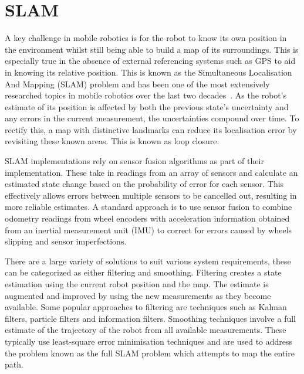 \section{SLAM}\label{litreview/slam}
A key challenge in mobile robotics is for the robot to know its own position in the
environment whilst still being able to build a map of its surroundings. 
This is especially true in the absence of external referencing systems
such as GPS to aid in knowing its relative position. This is known as the Simultaneous Localisation And Mapping (SLAM)
problem and has been one of the most extensively researched topics in mobile
robotics over the last two decades~\cite{grisetti2010tutorial}. As the robot's
estimate of its position is affected by both the previous state's uncertainty
and any errors in the current measurement, the uncertainties compound
over time. To rectify this, a map with distinctive landmarks can reduce its
localisation error by revisiting these known areas. This is known as loop closure.

SLAM implementations rely on sensor fusion algorithms as part of their implementation. 
These take in readings from an array of sensors and calculate an estimated state change
based on the probability of error for each sensor. This effectively allows errors between 
multiple sensors to be cancelled out, resulting in more reliable estimates. A standard 
approach is to use sensor fusion to combine odometry readings from wheel encoders with 
acceleration information obtained from an inertial measurement unit (IMU) to correct for 
errors caused by wheels slipping and sensor imperfections.

There are a large variety of solutions to suit various system requirements, these
can be categorized as either filtering and smoothing. Filtering creates a state estimation 
using the current robot position and the map. The estimate is augmented and improved
by using the new measurements as they become available. Some popular
approaches to filtering are techniques such as Kalman filters, particle filters
and information filters. Smoothing techniques involve a full estimate of the trajectory of
the robot from all available measurements. These typically use least-square error 
minimisation techniques and are used to address the problem known as the full SLAM 
problem which attempts to map the entire path.

